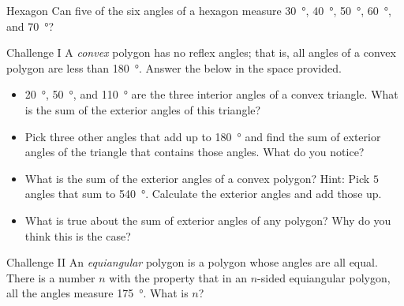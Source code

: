 \documentclass[14pt,letterpaper]{article}
\begin{document}
\begin{problem}{Hexagon}
 Can five of the six angles of a hexagon measure \SI{30}{\degree},
 \SI{40}{\degree}, \SI{50}{\degree}, \SI{60}{\degree}, and \SI{70}{\degree}?
\end{problem}

\begin{problem}{Challenge I}
 A \emph{convex} polygon has no reflex angles; that is, all angles of a convex
 polygon are less than \SI{180}{\degree}. Answer the below in the space
 provided.

 \begin{itemize}
  \item \SI{20}{\degree}, \SI{50}{\degree}, and \SI{110}{\degree} are the three
  interior angles of a convex triangle. What is the sum of the exterior angles
  of this triangle?
  \item Pick three other angles that add up to \SI{180}{\degree} and find the
  sum of exterior angles of the triangle that contains those angles. What do you
  notice?
  \item What is the sum of the exterior angles of a convex polygon? Hint: Pick
  $5$ angles that sum to \SI{540}{\degree}. Calculate the exterior angles and
  add those up.
  \item What is true about the sum of exterior angles of any polygon? Why do you
  think this is the case?
 \end{itemize}
\end{problem}

\begin{problem}{Challenge II}
  An \emph{equiangular} polygon is a polygon whose angles are all equal. There
  is a number $n$ with the property that in an $n$-sided equiangular polygon,
  all the angles measure \SI{175}{\degree}. What is $n$?
\end{problem}
\end{document}
